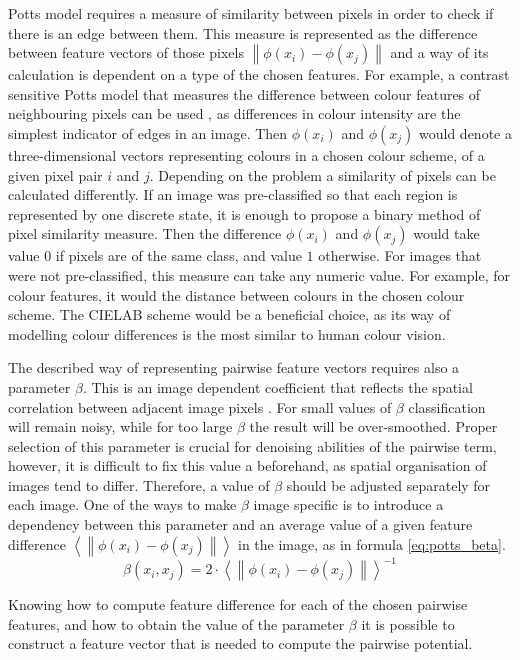 Potts model requires a measure of similarity between pixels in order to check if there is an edge between them. This measure is represented as the difference between feature vectors of those pixels $\left \| \phi(x_i) - \phi(x_j)\right \|$ and a way of its calculation is dependent on a type of the chosen features. For example, a contrast sensitive Potts model that measures the difference between colour features of neighbouring pixels can be used \cite{article_main}, as differences in colour intensity are the simplest indicator of edges in an image. Then $\phi(x_i)$ and $\phi(x_j)$ would denote a three-dimensional vectors representing colours in a chosen colour scheme, of a given pixel pair $i$ and $j$. Depending on the problem a similarity of pixels can be calculated differently. If an image was pre-classified so that each region is represented by one discrete state, it is enough to propose a binary method of pixel similarity measure. Then the difference $\phi(x_i)$ and $\phi(x_j)$ would take value $0$ if pixels are of the same class, and value $1$ otherwise. For images that were not pre-classified, this measure can take any numeric value. For example, for colour features, it would the distance between colours in the chosen colour scheme. The CIELAB scheme would be a beneficial choice, as its way of modelling colour differences is the most similar to human colour vision. 

The described way of representing pairwise feature vectors requires also a parameter $\beta$. This is an image dependent coefficient that reflects the spatial correlation between adjacent image pixels \cite{potts_beta}. For small values of $\beta$ classification will remain noisy, while for too large $\beta$ the result will be over-smoothed. Proper selection of this parameter is crucial for denoising abilities of the pairwise term, however, it is difficult to fix this value a beforehand, as spatial organisation of images tend to differ. Therefore, a value of $\beta$ should be adjusted separately for each image. One of the ways to make $\beta$ image specific is to introduce a dependency between this parameter and an average value of a given feature difference $\left \langle \left \| \phi(x_i) - \phi(x_j)\right \| \right \rangle$ in the image, as in formula \ref{eq:potts_beta}.
\begin{equation}
    \label{eq:potts_beta}
    \beta(x_i,x_j) = {2 \cdot {\left \langle \left \| \phi(x_i) - \phi(x_j)\right \| \right \rangle}} ^ {-1}
\end{equation}

Knowing how to compute feature difference for each of the chosen pairwise features, and how to obtain the value of the parameter $\beta$ it is possible to construct a feature vector that is needed to compute the pairwise potential. 